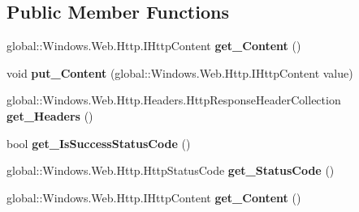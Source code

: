 \subsection*{Public Member Functions}
\begin{DoxyCompactItemize}
\item 
\mbox{\label{interface_windows_1_1_web_1_1_http_1_1_i_http_response_message_a13c5befebc999b269bc778dfe5452380}} 
global\+::\+Windows.\+Web.\+Http.\+I\+Http\+Content {\bfseries get\+\_\+\+Content} ()
\item 
\mbox{\label{interface_windows_1_1_web_1_1_http_1_1_i_http_response_message_afa96abe89f1a2c3c66e7d5bf323394be}} 
void {\bfseries put\+\_\+\+Content} (global\+::\+Windows.\+Web.\+Http.\+I\+Http\+Content value)
\item 
\mbox{\label{interface_windows_1_1_web_1_1_http_1_1_i_http_response_message_a6e4729e8452970899c28bff03d1c7559}} 
global\+::\+Windows.\+Web.\+Http.\+Headers.\+Http\+Response\+Header\+Collection {\bfseries get\+\_\+\+Headers} ()
\item 
\mbox{\label{interface_windows_1_1_web_1_1_http_1_1_i_http_response_message_a51eb8ecfec42519640fcb872df413f76}} 
bool {\bfseries get\+\_\+\+Is\+Success\+Status\+Code} ()
\item 
\mbox{\label{interface_windows_1_1_web_1_1_http_1_1_i_http_response_message_a707bd9334321d44dcf0d6b634c37b9f0}} 
global\+::\+Windows.\+Web.\+Http.\+Http\+Status\+Code {\bfseries get\+\_\+\+Status\+Code} ()
\item 
\mbox{\label{interface_windows_1_1_web_1_1_http_1_1_i_http_response_message_a13c5befebc999b269bc778dfe5452380}} 
global\+::\+Windows.\+Web.\+Http.\+I\+Http\+Content {\bfseries get\+\_\+\+Content} ()
\item 
\mbox{\label{interface_windows_1_1_web_1_1_http_1_1_i_http_response_message_afa96abe89f1a2c3c66e7d5bf323394be}} 

\end{DoxyCompactItemize}
